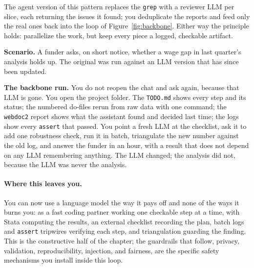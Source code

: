 \documentclass[
    a4paper,
    fontsize=10pt,
    twoside=true,
    numbers=noenddot,
]{kaobook}
\newcounter{appliedexample}
\newenvironment{appliedexample}[1][]{%
    \refstepcounter{appliedexample}%
    \begin{appliedexamplebox}[frametitle={Applied Example~\theappliedexample.~~#1}]%
}{%
    \end{appliedexamplebox}%
}
\begin{document}
The agent version of this pattern replaces the \texttt{grep} with a reviewer LLM per slice, each returning the issues it found; you deduplicate the reports and feed only the real ones back into the loop of Figure~\ref{fig:backbone}. Either way the principle holds: parallelize the work, but keep every piece a logged, checkable artifact.

\begin{appliedexample}[A one-hour reanalysis that survives the LLM changing]\label{ae:ch13-reanalysis}
\textbf{Scenario.} A funder asks, on short notice, whether a wage gap in last quarter's analysis holds up. The original was run against an LLM version that has since been updated.

\medskip
\textbf{The backbone run.} You do not reopen the chat and ask again, because that LLM is gone. You open the project folder. The \texttt{TODO.md} shows every step and its status; the numbered do-files rerun from raw data with one command; the \texttt{webdoc2} report shows what the assistant found and decided last time; the logs show every \texttt{assert} that passed. You point a fresh LLM at the checklist, ask it to add one robustness check, run it in batch, triangulate the new number against the old log, and answer the funder in an hour, with a result that does not depend on any LLM remembering anything. The LLM changed; the analysis did not, because the LLM was never the analysis.
\end{appliedexample}

\paragraph{Where this leaves you.} You can now use a language model the way it pays off and none of the ways it burns you: as a fast coding partner working one checkable step at a time, with Stata computing the results, an external checklist recording the plan, batch logs and \texttt{assert} tripwires verifying each step, and triangulation guarding the finding. This is the constructive half of the chapter; the guardrails that follow, privacy, validation, reproducibility, injection, and fairness, are the specific safety mechanisms you install inside this loop.
\end{document}

